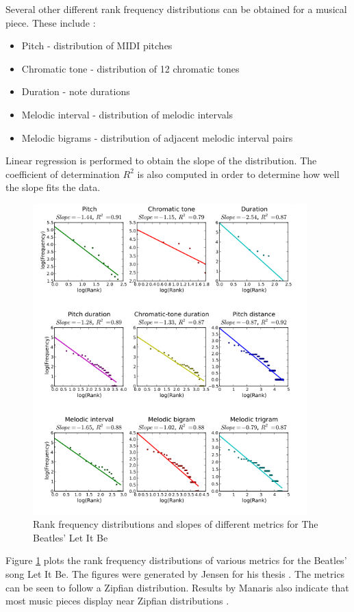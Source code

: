 Several other different rank frequency distributions can be obtained for a musical piece.
These include \cite{Manaris2005}:
\begin{itemize}
\item{Pitch}{ - distribution of \ac{MIDI} pitches}
\item{Chromatic tone}{ - distribution of 12 chromatic tones}
\item{Duration}{ - note durations}
\item{Melodic interval}{ - distribution of melodic intervals}
\item{Melodic bigrams}{ - distribution of adjacent melodic interval pairs}
\end{itemize}
Linear regression is performed to obtain the slope of the distribution. The coefficient of determination $R^2$ is also computed in order to determine how well the slope fits the data.

\begin{figure}
\includegraphics[width=400px]{../images/zipf_letitbe.png}
\caption[Rank frequency distributions for Let It Be]{Rank frequency distributions and slopes of different metrics for The Beatles' Let It Be
\footnotemark}
\label{ims:zipf_letitbe}
\end{figure}


Figure \ref{ims:zipf_letitbe} plots the rank frequency distributions of various metrics for the Beatles' song Let It Be. The figures were generated by Jensen for his thesis \cite{Dostal2013}. The metrics can be seen to follow a Zipfian distribution. Results by Manaris also indicate that most music pieces display near Zipfian distributions \cite{Manaris2005}.

